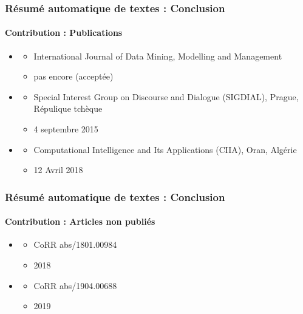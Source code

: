 \documentclass[xcolor=table]{beamer}
\begin{document}
\begin{frame}
\frametitle{Résumé automatique de textes : Conclusion}
\framesubtitle{Contribution : Publications}

\begin{itemize}
	\item {}
	\begin{itemize}
		\item {} International Journal of Data Mining, Modelling and Management
		\item {} pas encore (acceptée)
	\end{itemize}
	\item {}
	\begin{itemize}
		\item {} Special Interest Group on Discourse and Dialogue (SIGDIAL), Prague, Répulique tchèque
		\item {} 4 septembre 2015
	\end{itemize}
	\item {}
	\begin{itemize}
		\item {} Computational Intelligence and Its Applications (CIIA), Oran, Algérie
		\item {} 12 Avril 2018
	\end{itemize}
\end{itemize}
	
\end{frame}

\begin{frame}
\frametitle{Résumé automatique de textes : Conclusion}
\framesubtitle{Contribution : Articles non publiés}
	
\begin{itemize}
	\item {}
	\begin{itemize}
		\item {} CoRR abs/1801.00984
		\item {} 2018
	\end{itemize}
	\item {}
	\begin{itemize}
		\item {} CoRR abs/1904.00688
		\item {} 2019
	\end{itemize}
\end{itemize}
	
\end{frame}
\end{document}

